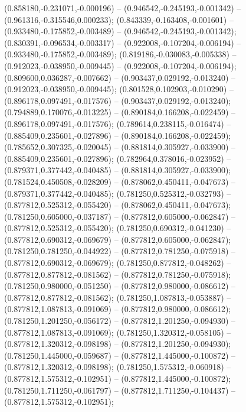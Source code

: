  (0.858180,-0.231071,-0.000196) -- (0.946542,-0.245193,-0.001342) -- (0.961316,-0.315546,0.000233);
 (0.843339,-0.163408,-0.001601) -- (0.933480,-0.175852,-0.003489) -- (0.946542,-0.245193,-0.001342);
 (0.830391,-0.096534,-0.003317) -- (0.922008,-0.107204,-0.006194) -- (0.933480,-0.175852,-0.003489);
 (0.819186,-0.030083,-0.005338) -- (0.912023,-0.038950,-0.009445) -- (0.922008,-0.107204,-0.006194);
 (0.809600,0.036287,-0.007662) -- (0.903437,0.029192,-0.013240) -- (0.912023,-0.038950,-0.009445);
 (0.801528,0.102903,-0.010290) -- (0.896178,0.097491,-0.017576) -- (0.903437,0.029192,-0.013240);
 (0.794889,0.170076,-0.013225) -- (0.890184,0.166208,-0.022459) -- (0.896178,0.097491,-0.017576);
 (0.789614,0.238115,-0.016474) -- (0.885409,0.235601,-0.027896) -- (0.890184,0.166208,-0.022459);
 (0.785652,0.307325,-0.020045) -- (0.881814,0.305927,-0.033900) -- (0.885409,0.235601,-0.027896);
 (0.782964,0.378016,-0.023952) -- (0.879371,0.377442,-0.040485) -- (0.881814,0.305927,-0.033900);
 (0.781524,0.450508,-0.028209) -- (0.878062,0.450411,-0.047673) -- (0.879371,0.377442,-0.040485);
 (0.781250,0.525312,-0.032793) -- (0.877812,0.525312,-0.055420) -- (0.878062,0.450411,-0.047673);
 (0.781250,0.605000,-0.037187) -- (0.877812,0.605000,-0.062847) -- (0.877812,0.525312,-0.055420);
 (0.781250,0.690312,-0.041230) -- (0.877812,0.690312,-0.069679) -- (0.877812,0.605000,-0.062847);
 (0.781250,0.781250,-0.044922) -- (0.877812,0.781250,-0.075918) -- (0.877812,0.690312,-0.069679);
 (0.781250,0.877812,-0.048262) -- (0.877812,0.877812,-0.081562) -- (0.877812,0.781250,-0.075918);
 (0.781250,0.980000,-0.051250) -- (0.877812,0.980000,-0.086612) -- (0.877812,0.877812,-0.081562);
 (0.781250,1.087813,-0.053887) -- (0.877812,1.087813,-0.091069) -- (0.877812,0.980000,-0.086612);
 (0.781250,1.201250,-0.056172) -- (0.877812,1.201250,-0.094930) -- (0.877812,1.087813,-0.091069);
 (0.781250,1.320312,-0.058105) -- (0.877812,1.320312,-0.098198) -- (0.877812,1.201250,-0.094930);
 (0.781250,1.445000,-0.059687) -- (0.877812,1.445000,-0.100872) -- (0.877812,1.320312,-0.098198);
 (0.781250,1.575312,-0.060918) -- (0.877812,1.575312,-0.102951) -- (0.877812,1.445000,-0.100872);
 (0.781250,1.711250,-0.061797) -- (0.877812,1.711250,-0.104437) -- (0.877812,1.575312,-0.102951);
